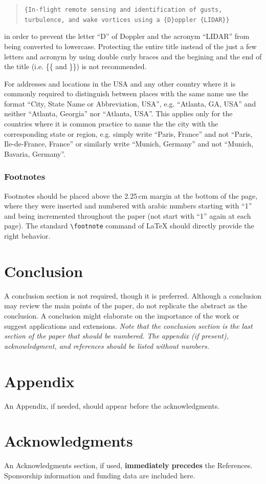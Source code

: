 \documentclass{CEAS_EuroGNC_2024}
\begin{document}
\begin{quote}
\verb|{In-flight remote sensing and identification of gusts, |\newline
\verb|turbulence, and wake vortices using a {D}oppler {LIDAR}}|
\end{quote}

\noindent in order to prevent the letter ``D'' of Doppler and the acronym ``LIDAR'' from being converted to lowercase. Protecting the entire title instead of the just a few letters and acronym by using double curly braces and the begining and the end of the title (i.e. \{\{ and \}\}) is not recommended.

For addresses and locations in the USA and any other country where it is commonly required to distinguish between places with the same name use the format ``City, State Name or Abbreviation, USA'', e.g. ``Atlanta, GA, USA'' and neither ``Atlanta, Georgia'' nor ``Atlanta, USA''. This applies only for the countries where it is common practice to name the the city with the corresponding state or region, e.g. simply write ``Paris, France'' and not ``Paris, Ile-de-France, France'' or similarly write ``Munich, Germany'' and not ``Munich, Bavaria, Germany''.

\subsubsection{Footnotes}
Footnotes should be placed above the 2.25\,cm margin at the bottom of the page, where they were inserted and numbered with arabic numbers starting with ``1'' and being incremented throughout the paper (not start with ``1'' again at each page). The standard \verb|\footnote| command of \LaTeX{} should directly provide the right behavior.













\section{Conclusion}
A conclusion section is not required, though it is preferred. Although a conclusion may review the main points of the paper, do not replicate the abstract as the conclusion. A conclusion might elaborate on the importance of the work or suggest applications and extensions. \textit{Note that the conclusion section is the last section of the paper that should be numbered. The appendix (if present), acknowledgment, and references should be listed without numbers.}


\section*{Appendix}

An Appendix, if needed, should appear before the acknowledgments.

\section*{Acknowledgments}
An Acknowledgments section, if used, \textbf{immediately precedes} the References. Sponsorship information and funding data are included here. 


\end{document}
